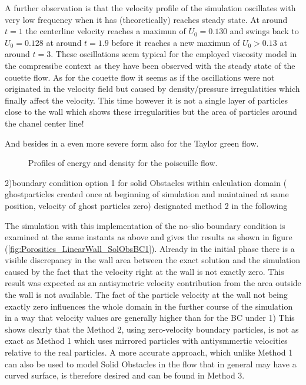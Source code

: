 \documentclass{report}
\begin{document}
A further observation is that the velocity profile of the simulation oscillates with very low frequency when it has (theoretically) reaches steady state. At around $t=1$ the centerline velocity reaches a maximun of $U_0=0.130$ and swings back to $U_0=0.128$ at around $t=1.9$ before it reaches a new maximun of $U_0>0.13$ at around $t=3$. These oscillations seem typical for the employed viscosity model in the compressibe context as they have been observed with the steady state of the couette flow. As for the couette flow it seems as if the oscillations were not originated in the velocity field but caused by density/pressure irregulatities which finally affect the velocity. This time however it is not a single layer of particles close to the wall which shows these irregularities but the area of particles around the chanel center line!

And besides in a even more severe form also for the Taylor green flow.

  
\begin{figure}[!htbp]
\centering
\label{fig:Porosities_LinearWall_domainEdgeBC_EnergyDensity}
\subfigure[energy]{
\label{fig:Porosities_LinearWall_domainEdgeBC_Energy}
}
\subfigure[density]{
\label{fig:Porosities_LinearWall_domainEdgeBC_tDensity}
}

\caption[Energy and Density Profiles Poiseuille]{Profiles of energy and density for the poiseuille flow.}

\end{figure}



 
2)boundary condition option 1 for solid Obstacles within calculation domain
( ghostparticles created once at beginning of simulation and maintained at same position, velocity of ghost particles zero) designated method 2 in the following


The simulation with this implementation of the no--slio boundary condition is examined at the same instants as above and gives the results as shown in figure (\ref{fig:Porosities_LinearWall_SolObsBC1}). Already in the initial phase there is a visible discrepancy in the wall area between the exact solution and the simulation caused by the fact that the velocity right at the wall is not exactly zero. This result was expected as an antisymetric velocity contribution from the area outside the wall is not available. The fact of the particle velocity at the wall not being exactly zero influences the whole domain in the further course of the simulation in a way that velocity values are generally higher than for the BC under 1)
This shows clearly that the Method 2, using zero-velocity boundary particles, is not as exact as Method 1 which uses mirrored particles with antiysmmertic velocities relative to the real particles. A more accurate approach, which unlike Method 1 can also be used to model Solid Obstacles in the flow that in general may have a curved surface, is therefore desired and can be found in Method 3.
\end{document}
